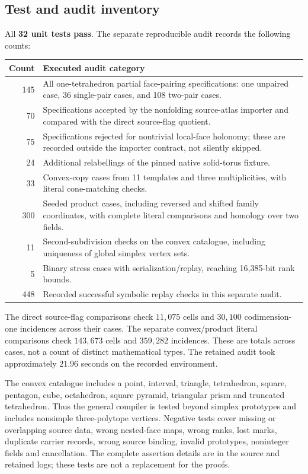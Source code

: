 \documentclass[11pt]{article}
\theoremstyle{definition}\newtheorem{definition}[theorem]{Definition}
\theoremstyle{remark}\newtheorem{remark}[theorem]{Remark}
\begin{document}
\subsection{Test and audit inventory}
All \textbf{32 unit tests pass}. The separate reproducible audit records the following counts:
\begin{center}\small
\begin{tabularx}{\linewidth}{rX}\toprule
Count & Executed audit category\\\midrule
145 & All one-tetrahedron partial face-pairing specifications: one unpaired case, 36 single-pair cases, and 108 two-pair cases.\\
70 & Specifications accepted by the nonfolding source-atlas importer and compared with the direct source-flag quotient.\\
75 & Specifications rejected for nontrivial local-face holonomy; these are recorded outside the importer contract, not silently skipped.\\
24 & Additional relabellings of the pinned native solid-torus fixture.\\
33 & Convex-copy cases from 11 templates and three multiplicities, with literal cone-matching checks.\\
300 & Seeded product cases, including reversed and shifted family coordinates, with complete literal comparisons and homology over two fields.\\
11 & Second-subdivision checks on the convex catalogue, including uniqueness of global simplex vertex sets.\\
5 & Binary stress cases with serialization/replay, reaching 16,385-bit rank bounds.\\
448 & Recorded successful symbolic replay checks in this separate audit.\\\bottomrule
\end{tabularx}
\end{center}

The direct source-flag comparisons check \(11{,}075\) cells and \(30{,}100\) codimension-one incidences across their cases. The separate convex/product literal comparisons check \(143{,}673\) cells and \(359{,}282\) incidences. These are totals across cases, not a count of distinct mathematical types. The retained audit took approximately \(21.96\) seconds on the recorded environment.

The convex catalogue includes a point, interval, triangle, tetrahedron, square, pentagon, cube, octahedron, square pyramid, triangular prism and truncated tetrahedron. Thus the general compiler is tested beyond simplex prototypes and includes nonsimple three-polytope vertices. Negative tests cover missing or overlapping source data, wrong nested-face maps, wrong ranks, lost marks, duplicate carrier records, wrong source binding, invalid prototypes, noninteger fields and cancellation. The complete assertion details are in the source and retained logs; these tests are not a replacement for the proofs.
\end{document}
